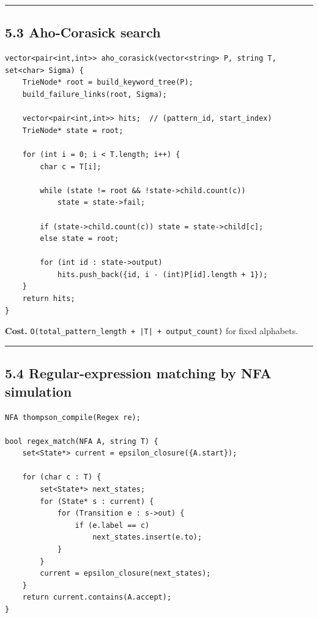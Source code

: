 \documentclass[11pt]{article}
\begin{document}
\begin{center}\rule{0.5\linewidth}{0.5pt}\end{center}

\subsection{5.3 Aho-Corasick search}\label{aho-corasick-search}

\begin{verbatim}
vector<pair<int,int>> aho_corasick(vector<string> P, string T, set<char> Sigma) {
    TrieNode* root = build_keyword_tree(P);
    build_failure_links(root, Sigma);

    vector<pair<int,int>> hits;  // (pattern_id, start_index)
    TrieNode* state = root;

    for (int i = 0; i < T.length; i++) {
        char c = T[i];

        while (state != root && !state->child.count(c))
            state = state->fail;

        if (state->child.count(c)) state = state->child[c];
        else state = root;

        for (int id : state->output)
            hits.push_back({id, i - (int)P[id].length + 1});
    }
    return hits;
}
\end{verbatim}

\textbf{Cost.} \texttt{O(total\_pattern\_length + |T| + output\_count)} for fixed alphabets.

\begin{center}\rule{0.5\linewidth}{0.5pt}\end{center}

\subsection{5.4 Regular-expression matching by NFA simulation}\label{regular-expression-matching-by-nfa-simulation}

\begin{verbatim}
NFA thompson_compile(Regex re);

bool regex_match(NFA A, string T) {
    set<State*> current = epsilon_closure({A.start});

    for (char c : T) {
        set<State*> next_states;
        for (State* s : current) {
            for (Transition e : s->out) {
                if (e.label == c)
                    next_states.insert(e.to);
            }
        }
        current = epsilon_closure(next_states);
    }
    return current.contains(A.accept);
}
\end{verbatim}
\end{document}
